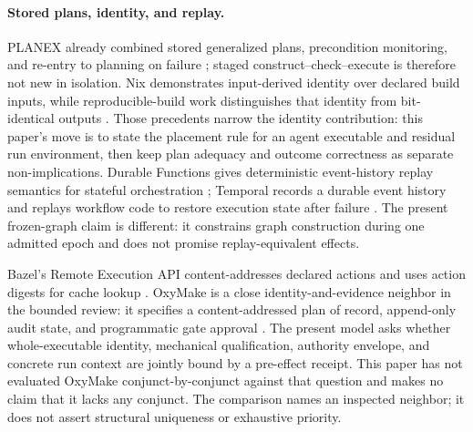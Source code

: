 \documentclass[11pt]{article}
\begin{document}
\paragraph{Stored plans, identity, and replay.}
PLANEX already combined stored generalized plans, precondition monitoring, and
re-entry to planning on failure \cite{Fikes1972Planex}; staged
construct--check--execute is therefore not new in isolation.  Nix demonstrates
input-derived identity over declared build inputs, while reproducible-build
work distinguishes that identity from bit-identical outputs
\cite{Dolstra2010NixOS,Lamb2022ReproducibleBuilds}.  Those precedents narrow the
identity contribution: this paper's move is to state the placement rule for an
agent executable and residual run environment, then keep plan adequacy and
outcome correctness as separate non-implications. Durable Functions gives
deterministic event-history replay semantics for stateful orchestration
\cite{Burckhardt2021DurableFunctions}; Temporal records a durable event
history and replays workflow code to restore execution state after failure
\cite{Temporal2026EventHistory}. The present frozen-graph claim is different:
it constrains graph construction during one admitted epoch and does not
promise replay-equivalent effects.

Bazel's Remote Execution API content-addresses declared actions and uses action
digests for cache lookup \cite{Bazel2026RemoteExecution}. OxyMake is a close
identity-and-evidence neighbor in the bounded review: it specifies a
content-addressed plan of record, append-only audit state, and programmatic gate
approval \cite{Serie2026OxyMake}. The present model asks whether
whole-executable identity, mechanical qualification, authority envelope, and
concrete run context are jointly bound by a pre-effect receipt. This paper has
not evaluated OxyMake conjunct-by-conjunct against that question and makes no
claim that it lacks any conjunct. The comparison names an inspected neighbor;
it does not assert structural uniqueness or exhaustive priority.
\end{document}
